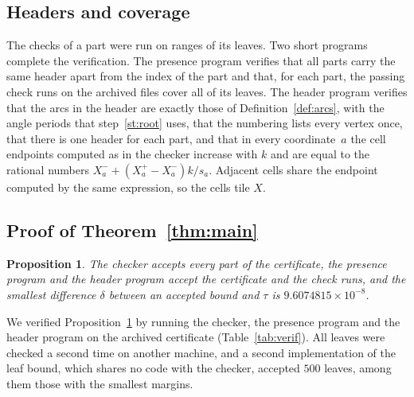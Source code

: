 \documentclass[11pt]{amsart}
\newtheorem{proposition}[theorem]{Proposition}
\theoremstyle{definition}
\theoremstyle{remark}
\numberwithin{equation}{section}
\newcommand{\MINMARGINFULL}{9.6074815\times10^{-8}}
\begin{document}
\subsection{Headers and coverage}\label{sec:headers}
The checks of a part were run on ranges of its leaves. Two short programs complete the verification. The presence program verifies that all parts carry the same header apart from the index of the part and that, for each part, the passing check runs on the archived files cover all of its leaves. The header program verifies that the arcs in the header are exactly those of Definition~\ref{def:arcs}, with the angle periods that step~\ref{st:root} uses, that the numbering lists every vertex once, that there is one header for each part, and that in every coordinate~$a$ the cell endpoints computed as in the checker increase with $k$ and are equal to the rational numbers $X^-_a+(X^+_a-X^-_a)k/s_a$. Adjacent cells share the endpoint computed by the same expression, so the cells tile $X$.

\subsection{Proof of Theorem~\ref{thm:main}}

\begin{proposition}\label{prop:cert}
The checker accepts every part of the certificate, the presence program and the header program accept the certificate and the check runs, and the smallest difference $\delta$ between an accepted bound and $\tau$ is $\MINMARGINFULL$.
\end{proposition}

We verified Proposition~\ref{prop:cert} by running the checker, the presence program and the header program on the archived certificate (Table~\ref{tab:verif}). All leaves were checked a second time on another machine, and a second implementation of the leaf bound, which shares no code with the checker, accepted $500$ leaves, among them those with the smallest margins.
\end{document}

